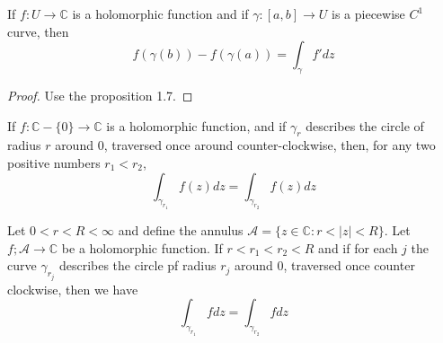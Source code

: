 \documentclass[lang=en, color=blue, ]{elegantbook}
\newcommand{\C}{\mathbb{C}}
\begin{document}
\begin{lemma}
If $f:U\to \C$ is a holomorphic function and if $\gamma:[a,b]\to U$ is a piecewise $C^1$ curve, then
\[f(\gamma(b))-f(\gamma(a)) = \int_{\gamma} f'dz\]
\end{lemma}
\begin{proof}
    Use the proposition 1.7.
\end{proof}

\begin{proposition}
If $f:\C-\{0\} \to \C$ is a holomorphic function, and if $\gamma_r$ describes the circle of radius $r$ around $0$, traversed once around counter-clockwise, then, for any two positive numbers $r_1<r_2$,
\[\int_{\gamma_{r_1}} f(z)dz = \int_{\gamma_{r_2}} f(z)dz\]
\end{proposition}

\begin{proposition}
    Let $0<r<R<\infty$ and define the annulus $\mathcal{A} = \{z\in\C: r < |z| < R\}$. Let $f;\mathcal{A}\to\C$ be a holomorphic function. If $r<r_1<r_2<R$ and if for each $j$ the curve $\gamma_{r_j}$ describes the circle pf radius $r_j$ around $0$, traversed once counter clockwise, then we have 
    \[
    \int_{\gamma_{r_1}}fdz = \int_{\gamma_{r_2}}fdz
    \]
\end{proposition}

\newpage
\end{document}
